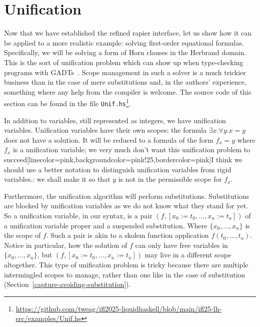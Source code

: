 \documentclass[sigconf, review]{acmart}
\newcommand{\improvement}[1]{\todo[linecolor=pink,backgroundcolor=pink!25,bordercolor=pink]{#1}}
\renewcommand{\todo}{}
\newcommand{\improvement}[1]{{}}
\newcommand{\tc}[1]{{\small\texttt{#1}}}
\newcommand{\sourcefile}[1]{\tc{#1}\footnote{\scriptsize\url{https://github.com/tweag/ifl2025-liquidhaskell/blob/main/ifl25-lh-src/examples/#1}}}
\begin{document}




\section{Unification}
\label{unification}

Now that we have established the refined rapier interface, let us show how it
can be applied to a more realistic example: solving first-order equational
formulas. Specifically, we will be solving a form of Horn clauses in
the Herbrand domain. This is the sort of unification problem which can show up
when type-checking programs with GADTs~\cite{schrijvers09}. Scope management in
such a solver is a much trickier business than in the case of mere substitutions
and, in the authors' experience, something where any help from the compiler is welcome.
The source code of this section can be found in the file
\sourcefile{Unif.hs}.

In addition to variables, still represented as integers, we have unification
variables. Unification variables have their own scopes: the formula
$\exists x. \forall y. x=y$ does not have a solution. It will be reduced to a
formula of the form $f_{x} = y$ where $f_{x}$ is a unification variable; we very much
don't want this unification problem to succeed\improvement{I think we should
  use a better notation to distinguish unification variables from rigid
  variables.}: we shall make it so that $y$ is not in the permissible scope for $f_{x}$.

Furthermore, the unification algorithm will perform substitutions. Substitutions are blocked by
unification variables as we do not know what they stand for yet. So a unification
variable, in our syntax, is a pair $(f, [x_0:=t_0,\ldots,x_n:=t_n])$ of a
unification variable proper and a suspended substitution. Where
$\{x_0,\ldots,x_{n}\}$ is the scope of $f$. Such a pair is akin to a skolem
function application $f(t_0,\ldots,t_n)$. Notice in particular, how the solution
of $f$ can only have free variables in $\{x_0,\ldots,x_{n}\}$, but
$(f, [x_0:=t_0,\ldots,x_n:=t_n])$ may live in a different scope altogether.
This type of unification problem is tricky because there are multiple
intermingled scopes to manage, rather than one like
in the case of substitution (Section~\ref{capture-avoiding-substitution}).
\end{document}
